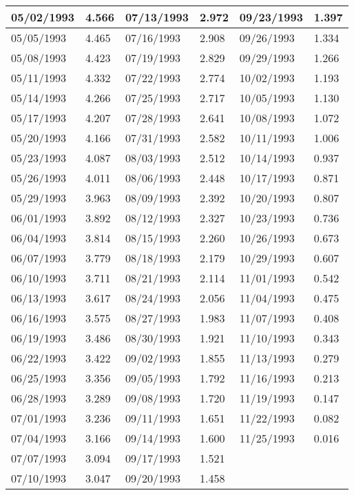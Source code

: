 \begin{tabular}{|l|l|l|l|l|l|}
\hline
05/02/1993 & 4.566  & 07/13/1993 & 2.972  & 09/23/1993 & 1.397  \\
\hline
05/05/1993 & 4.465  & 07/16/1993 & 2.908  & 09/26/1993 & 1.334  \\
\hline
05/08/1993 & 4.423  & 07/19/1993 & 2.829  & 09/29/1993 & 1.266  \\
\hline
05/11/1993 & 4.332  & 07/22/1993 & 2.774  & 10/02/1993 & 1.193  \\
\hline
05/14/1993 & 4.266  & 07/25/1993 & 2.717  & 10/05/1993 & 1.130  \\
\hline
05/17/1993 & 4.207  & 07/28/1993 & 2.641  & 10/08/1993 & 1.072  \\
\hline
05/20/1993 & 4.166  & 07/31/1993 & 2.582  & 10/11/1993 & 1.006  \\
\hline
05/23/1993 & 4.087  & 08/03/1993 & 2.512  & 10/14/1993 & 0.937  \\
\hline
05/26/1993 & 4.011  & 08/06/1993 & 2.448  & 10/17/1993 & 0.871  \\
\hline
05/29/1993 & 3.963  & 08/09/1993 & 2.392  & 10/20/1993 & 0.807  \\
\hline
06/01/1993 & 3.892  & 08/12/1993 & 2.327  & 10/23/1993 & 0.736  \\
\hline
06/04/1993 & 3.814  & 08/15/1993 & 2.260  & 10/26/1993 & 0.673  \\
\hline
06/07/1993 & 3.779  & 08/18/1993 & 2.179  & 10/29/1993 & 0.607  \\
\hline
06/10/1993 & 3.711  & 08/21/1993 & 2.114  & 11/01/1993 & 0.542  \\
\hline
06/13/1993 & 3.617  & 08/24/1993 & 2.056  & 11/04/1993 & 0.475  \\
\hline
06/16/1993 & 3.575  & 08/27/1993 & 1.983  & 11/07/1993 & 0.408  \\
\hline
06/19/1993 & 3.486  & 08/30/1993 & 1.921  & 11/10/1993 & 0.343  \\
\hline
06/22/1993 & 3.422  & 09/02/1993 & 1.855  & 11/13/1993 & 0.279  \\
\hline
06/25/1993 & 3.356  & 09/05/1993 & 1.792  & 11/16/1993 & 0.213  \\
\hline
06/28/1993 & 3.289  & 09/08/1993 & 1.720  & 11/19/1993 & 0.147  \\
\hline
07/01/1993 & 3.236  & 09/11/1993 & 1.651  & 11/22/1993 & 0.082  \\
\hline
07/04/1993 & 3.166  & 09/14/1993 & 1.600  & 11/25/1993 & 0.016  \\
\hline
07/07/1993 & 3.094  & 09/17/1993 & 1.521  &  &  \\
\hline
07/10/1993 & 3.047  & 09/20/1993 & 1.458  &  &  \\
\hline
\end{tabular}
